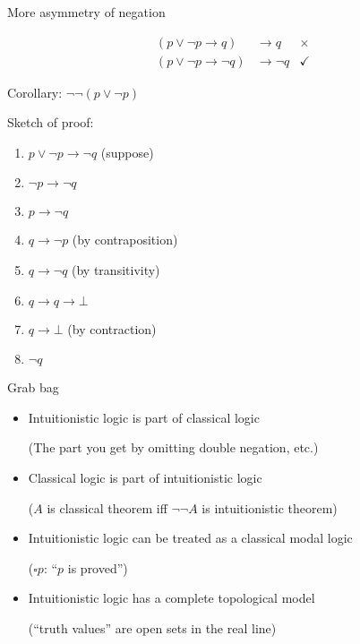 \documentclass{beamer}
\newcommand{\nec}{\square}
\begin{document}
\begin{frame}{More asymmetry of negation}
\begin{minipage}{.35\textwidth}
\begin{align*}
    (p\lor\lnot p\to q)&\to q &\times \\
    (p\lor\lnot p\to\lnot q)&\to \lnot q &\checkmark
\end{align*}

Corollary: $\lnot\lnot (p\lor\lnot p)$
\end{minipage}
\hfill
\begin{minipage}{.50\textwidth}
Sketch of proof:
\begin{enumerate}
\item $p\lor\lnot p\to\lnot q$ (suppose)
\item $\lnot p\to\lnot q$
\item $p\to\lnot q$
\item $q\to\lnot p$ (by contraposition)
\item $q\to\lnot q$ (by transitivity)
\item $q\to q\to\bot$
\item $q\to\bot$ (by contraction)
\item $\lnot q$
\end{enumerate}
\end{minipage}
\end{frame}

\begin{frame}{Grab bag}

\begin{itemize}
\item Intuitionistic logic is part of classical logic

    (The part you get by omitting double negation, etc.)

\item Classical logic is part of intuitionistic logic

    ($A$ is classical theorem iff $\lnot\lnot A$ is intuitionistic theorem)

\item Intuitionistic logic can be treated as a classical modal logic

    ($\nec p$: ``$p$ is proved'')

\item Intuitionistic logic has a complete topological model

    (``truth values'' are open sets in the real line)
\end{itemize}
\end{frame}
\end{document}
